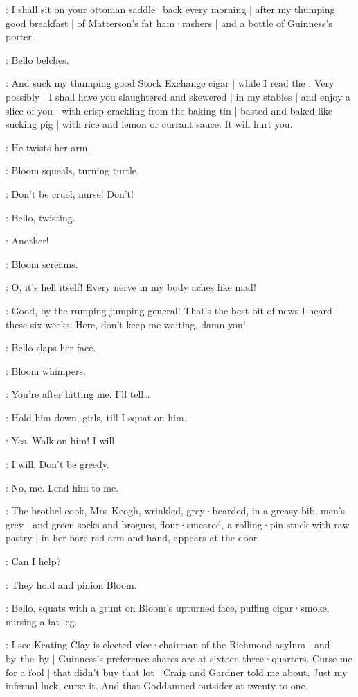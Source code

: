 \Bello:
I shall sit on your ottoman saddle·back every morning |
after my thumping good breakfast |
of Matterson's fat ham·rashers |
and a bottle of Guinness's porter.

:
Bello belches.

\Bello:
And suck my thumping good Stock Exchange cigar |
while I read the .
Very possibly |
I shall have you slaughtered and skewered |
in my stables |
and enjoy a slice of you |
with crisp crackling from the baking tin |
%
basted and baked like sucking pig |
with rice and lemon or currant sauce.
It will hurt you.

:
He twists her arm.

:
Bloom squeals,
turning turtle.

\Bloom:
Don't be cruel,
nurse!
Don't!

:
Bello,
twisting.

\Bello:
Another!

:
Bloom screams.

\Bloom:
O,
it's hell itself!
Every nerve in my body aches like mad!

\Bello:
Good,
by the rumping jumping general!
%
That's the best bit of news I heard |
these six weeks.
Here,
don't keep me waiting,
damn you!

:
Bello slaps her face.

:
Bloom whimpers.

\Bloom:
You're after hitting me.
I'll tell…

\Bello:
Hold him down,
girls,
till I squat on him.

\Zoe:
Yes.
Walk on him!
I will.

\Florry:
I will.
Don't be greedy.

\Kitty:
No,
me.
Lend him to me.

:
The brothel cook,
Mrs~Keogh,
wrinkled,
grey·bearded,
in a greasy bib,
men's grey |
and green socks and brogues,
flour·smeared,
a rolling·pin stuck with raw pastry |
in her bare red arm and hand,
appears at the door.

\MrsKeogh:
Can I help?

:
They hold and pinion Bloom.

:
Bello,
squats with a grunt on Bloom's upturned face,
%
puffing cigar·smoke,
nursing a fat leg.

\Bello:
I see Keating Clay is elected vice·chairman of the Richmond asylum |
and by~the~by |
Guinness's preference shares are at sixteen three·quarters.
Curse me for a fool |
that didn't buy that lot |
Craig and Gardner told me about.
Just my infernal luck,
curse it.
And that Goddamned outsider  at twenty to one.

